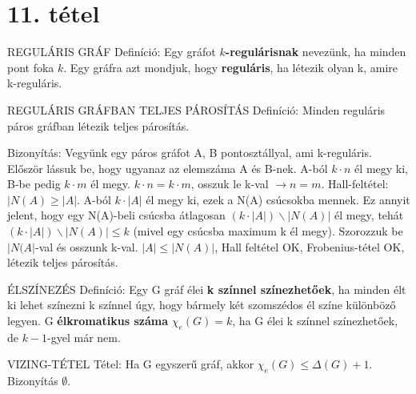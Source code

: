 \section{11. tétel}

\begin{shaded}
REGULÁRIS GRÁF Definíció: Egy gráfot \textbf{$k$-regulárisnak} nevezünk, ha minden pont foka $k$. Egy gráfra azt mondjuk, hogy \textbf{reguláris}, ha létezik olyan k, amire k-reguláris.
\end{shaded}
\begin{framed}
REGULÁRIS GRÁFBAN TELJES PÁROSÍTÁS Definíció: Minden reguláris páros gráfban létezik teljes párosítás.
\end{framed}
\begin{leftbar}
Bizonyítás:
Vegyünk egy páros gráfot A, B pontosztállyal, ami k-reguláris. Először lássuk be, hogy ugyanaz az elemszáma A és B-nek. A-ból $k\cdot n$ él megy ki, B-be pedig $k \cdot m$ él megy. $k\cdot n = k\cdot m$, osszuk le k-val $\rightarrow n = m$. Hall-feltétel: $|N(A) \geq |A|$. A-ból $k\cdot|A|$ él megy ki, ezek a N(A) csúcsokba mennek. Ez annyit jelent, hogy egy N(A)-beli csúcsba átlagosan $(k\cdot |A|) \backslash |N(A)|$ él megy, tehát $(k\cdot |A|) \backslash |N(A)| \leq k$ (mivel egy csúcsba maximum k él megy). Szorozzuk be $|N(A|$-val és osszunk k-val. $|A| \leq |N(A)|$, Hall feltétel OK, Frobenius-tétel OK, létezik teljes párosítás.
\end{leftbar}
\begin{shaded}
ÉLSZÍNEZÉS Definíció: Egy G gráf élei \textbf{k színnel színezhetőek}, ha minden élt ki lehet színezni k színnel úgy, hogy bármely két szomszédos él színe különböző legyen. G \textbf{élkromatikus száma} $\chi_e(G) = k$, ha G élei k színnel színezhetőek, de $k - 1$-gyel már nem.
\end{shaded}
\begin{framed}
VIZING-TÉTEL Tétel: Ha G egyszerű gráf, akkor $\chi_e(G) \leq \Delta(G) + 1$. Bizonyítás $\emptyset$.
\end{framed}
